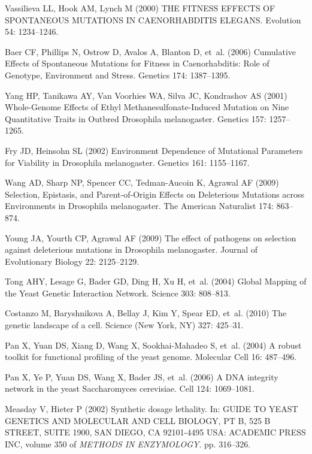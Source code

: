 \documentclass[10pt]{article}
\begin{document}
\begin{thebibliography}{10}
Vassilieva LL, Hook AM, Lynch M (2000) {THE FITNESS EFFECTS OF SPONTANEOUS
  MUTATIONS IN CAENORHABDITIS ELEGANS}.
\newblock Evolution 54: 1234--1246.

Baer CF, Phillips N, Ostrow D, Avalos A, Blanton D, et~al. (2006) {Cumulative
  Effects of Spontaneous Mutations for Fitness in Caenorhabditis: Role of
  Genotype, Environment and Stress}.
\newblock Genetics 174: 1387--1395.

Yang HP, Tanikawa AY, {Van Voorhies} WA, Silva JC, Kondrashov AS (2001)
  {Whole-Genome Effects of Ethyl Methanesulfonate-Induced Mutation on Nine
  Quantitative Traits in Outbred Drosophila melanogaster}.
\newblock Genetics 157: 1257--1265.

Fry JD, Heinsohn SL (2002) {Environment Dependence of Mutational Parameters for
  Viability in Drosophila melanogaster}.
\newblock Genetics 161: 1155--1167.

Wang AD, Sharp NP, Spencer CC, Tedman-Aucoin K, Agrawal AF (2009) {Selection,
  Epistasis, and Parent‐of‐Origin Effects on Deleterious Mutations across
  Environments in Drosophila melanogaster.}
\newblock The American Naturalist 174: 863--874.

Young JA, Yourth CP, Agrawal AF (2009) {The effect of pathogens on selection
  against deleterious mutations in Drosophila melanogaster}.
\newblock Journal of Evolutionary Biology 22: 2125--2129.

Tong AHY, Lesage G, Bader GD, Ding H, Xu H, et~al. (2004) {Global Mapping of
  the Yeast Genetic Interaction Network}.
\newblock Science 303: 808--813.

Costanzo M, Baryshnikova A, Bellay J, Kim Y, Spear ED, et~al. (2010) {The
  genetic landscape of a cell.}
\newblock Science (New York, NY) 327: 425--31.

Pan X, Yuan DS, Xiang D, Wang X, Sookhai-Mahadeo S, et~al. (2004) {A robust
  toolkit for functional profiling of the yeast genome}.
\newblock Molecular Cell 16: 487--496.

Pan X, Ye P, Yuan DS, Wang X, Bader JS, et~al. (2006) {A DNA integrity network
  in the yeast Saccharomyces cerevisiae}.
\newblock Cell 124: 1069--1081.

Measday V, Hieter P (2002) {Synthetic dosage lethality}.
\newblock In: GUIDE TO YEAST GENETICS AND MOLECULAR AND CELL BIOLOGY, PT B, 525
  B STREET, SUITE 1900, SAN DIEGO, CA 92101-4495 USA: ACADEMIC PRESS INC,
  volume 350 of \emph{METHODS IN ENZYMOLOGY}. pp. 316--326.


\end{thebibliography}
\end{document}
